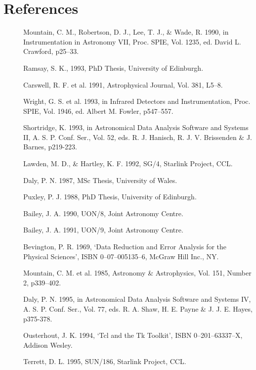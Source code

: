 \documentclass[a4paper]{book}
\newcommand{\stardocinitials}  {SUN}
\newcommand{\stardocnumber}    {27.5}
\newcommand{\stardocname}{\stardocinitials /\stardocnumber}
\renewcommand{\_}{{\tt\char'137}}
\begin{document}
\chapter*{References}
\markboth{References}{\stardocname}

\begin{description}
\item[] Mountain, C. M., Robertson, D. J., Lee, T. J., \& Wade, R. 1990,
      in Instrumentation in Astronomy VII, Proc. SPIE, Vol. 1235, ed. David L. Crawford, p25--33.
\item[] Ramsay, S. K., 1993, PhD Thesis, University of Edinburgh.
\item[] Carswell, R. F. et al. 1991, Astrophysical Journal, Vol. 381, L5--8.
\item[] Wright, G. S. et al. 1993, in Infrared Detectors and Instrumentation, Proc. SPIE,
      Vol. 1946, ed. Albert M. Fowler, p547--557.
\item[] Shortridge, K. 1993, in  Astronomical Data Analysis Software
      and Systems II, A. S. P. Conf. Ser., Vol. 52, eds. R. J. Hanisch, 
      R. J. V. Brissenden \& J. Barnes, p219-223.
\item[] Lawden, M. D., \& Hartley, K. F. 1992, SG/4, Starlink Project, CCL.
\item[] Daly, P. N. 1987, MSc Thesis, University of Wales.
\item[] Puxley, P. J. 1988, PhD Thesis, University of Edinburgh.
\item[] Bailey, J. A. 1990, UON/8, Joint Astronomy Centre.
\item[] Bailey, J. A. 1991, UON/9, Joint Astronomy Centre.
\item[] Bevington, P. R. 1969, `Data Reduction and Error Analysis for the Physical Sciences',
      ISBN 0--07--005135--6, McGraw Hill Inc., NY.
\item[] Mountain, C. M. et al. 1985, Astronomy \& Astrophysics, Vol. 151, Number 2, p339--402.
\item[] Daly, P. N. 1995, in Astronomical Data Analysis Software and Systems IV, 
      A. S. P. Conf. Ser., Vol. 77, eds. R. A. Shaw, H. E. Payne \& J. J. E. Hayes, p375-378.
\item[] Ousterhout, J. K. 1994, `Tcl and the Tk Toolkit', ISBN 0--201--63337--X, Addison Wesley.
\item[] Terrett, D. L. 1995, SUN/186, Starlink Project, CCL.
\end{description}
\end{document}
